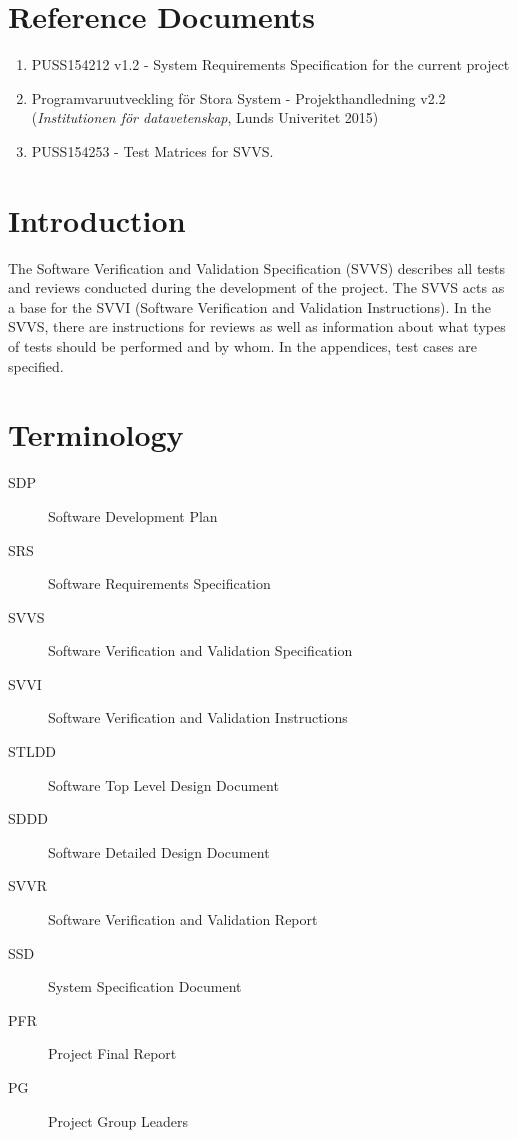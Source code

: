\documentclass[a4paper]{article}
\begin{document}
\setcounter{tocdepth}{2}
\tableofcontents
\newpage
{}


\section{Reference Documents}
\begin{enumerate}
\item PUSS154212 v1.2 - System Requirements Specification for the current project \label{refdocs:srs}
\item Programvaruutveckling för Stora System - Projekthandledning v2.2 (\textit{Institutionen för datavetenskap}, Lunds Univeritet 2015) \label{refdocs:projekthandledning}
\item PUSS154253 - Test Matrices for SVVS. \label{refdocs:matrices}
\end{enumerate}

\section{Introduction}
The Software Verification and Validation Specification (SVVS) describes all tests and reviews conducted during the development of the project. The SVVS acts as a base for the SVVI (Software Verification and Validation Instructions).
In the SVVS, there are instructions for reviews as well as information about what types of tests should be performed and by whom. In the appendices, test cases are specified.


\section{Terminology}
\begin{description}
\item[SDP] Software Development Plan
\item[SRS] Software Requirements Specification
\item[SVVS] Software Verification and Validation Specification
\item[SVVI] Software Verification and Validation Instructions
\item[STLDD] Software Top Level Design Document
\item[SDDD] Software Detailed Design Document
\item[SVVR] Software Verification and Validation Report
\item[SSD] System Specification Document
\item[PFR] Project Final Report
\item[PG] Project Group Leaders
\end{description}
\end{document}
